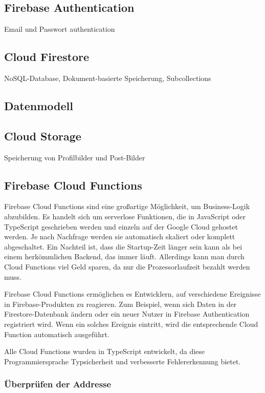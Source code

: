 \subsection{Firebase Authentication}
Email und Passwort authentication

\subsection{Cloud Firestore}
NoSQL-Database, Dokument-basierte Speicherung, Subcollections

\subsection{Datenmodell}




\subsection{Cloud Storage}
Speicherung von Profilbilder und Post-Bilder
\subsection{Firebase Cloud Functions}
Firebase Cloud Functions sind eine großartige Möglichkeit,
um Business-Logik abzubilden. Es handelt sich um serverlose
Funktionen, die in JavaScript oder TypeScript geschrieben
werden und einzeln auf der Google Cloud gehostet werden. Je
nach Nachfrage werden sie automatisch skaliert oder komplett
abgeschaltet. Ein Nachteil ist, dass die Startup-Zeit länger
sein kann als bei einem herkömmlichen Backend, das immer
läuft. Allerdings kann man durch Cloud Functions viel Geld
sparen, da nur die Prozessorlaufzeit bezahlt werden muss.

Firebase Cloud Functions ermöglichen es Entwicklern, auf verschiedene Ereignisse in Firebase-Produkten zu reagieren. Zum Beispiel, wenn sich Daten in der Firestore-Datenbank ändern oder ein neuer Nutzer in Firebase Authentication registriert wird. Wenn ein solches Ereignis eintritt, wird die entsprechende Cloud Function automatisch ausgeführt.

Alle Cloud Functions wurden in TypeScript entwickelt, da diese Programmiersprache Typsicherheit und verbesserte Fehlererkennung bietet.

\subsubsection{Überprüfen der Addresse}

